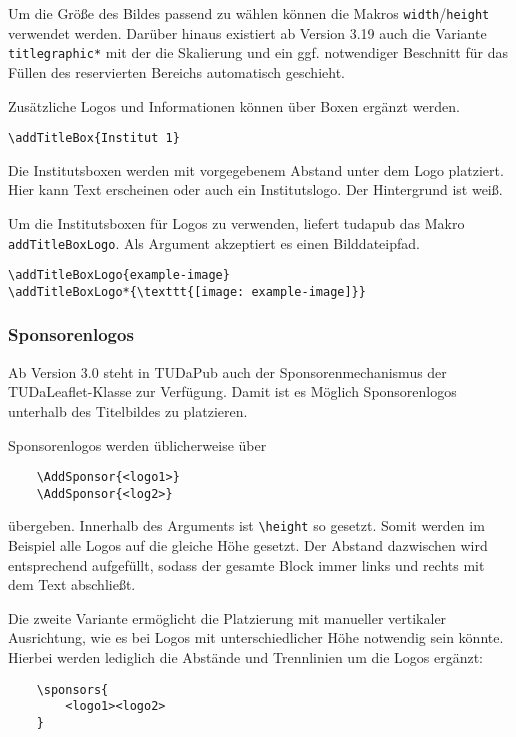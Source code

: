 \documentclass[
	ngerman,
	accentcolor=9c,%
	]{tudapub}
\let\code\texttt
\let\cls\textsf
\begin{document}
Um die Größe des Bildes passend zu wählen können die Makros \code{width}/\code{height} verwendet werden. Darüber hinaus existiert ab Version 3.19 auch die Variante \code{titlegraphic*} mit der die Skalierung und ein ggf. notwendiger Beschnitt für das Füllen des reservierten Bereichs automatisch geschieht.

Zusätzliche Logos und Informationen können über Boxen ergänzt werden.

\begin{verbatim}
\addTitleBox{Institut 1}
\end{verbatim}
Die Institutsboxen werden mit vorgegebenem Abstand unter dem Logo platziert. Hier kann Text erscheinen oder auch ein Institutslogo. Der Hintergrund ist weiß.

Um die Institutsboxen für Logos zu verwenden, liefert \cls{tudapub} das Makro \code{addTitleBoxLogo}. Als Argument akzeptiert es einen Bilddateipfad.

\begin{verbatim}
\addTitleBoxLogo{example-image}
\addTitleBoxLogo*{\texttt{[image: example-image]}}
\end{verbatim}

\subsubsection{Sponsorenlogos}
Ab Version 3.0 steht in TUDaPub auch der Sponsorenmechanismus der TUDaLeaflet-Klasse zur Verfügung. Damit ist es Möglich Sponsorenlogos unterhalb des Titelbildes zu platzieren.

Sponsorenlogos werden üblicherweise über
\begin{verbatim}
	\AddSponsor{<logo1>}
	\AddSponsor{<log2>}
\end{verbatim}
übergeben. Innerhalb des Arguments ist \verb+\height+ so gesetzt. Somit werden im Beispiel alle Logos auf die gleiche Höhe gesetzt. Der Abstand dazwischen wird entsprechend aufgefüllt, sodass der gesamte Block immer links und rechts mit dem Text abschließt.

Die zweite Variante ermöglicht die Platzierung mit manueller vertikaler Ausrichtung, wie es bei Logos mit unterschiedlicher Höhe notwendig sein könnte. Hierbei werden lediglich die Abstände und Trennlinien um die Logos ergänzt:

\begin{verbatim}
	\sponsors{
		<logo1><logo2>
	}
\end{verbatim}
\end{document}
